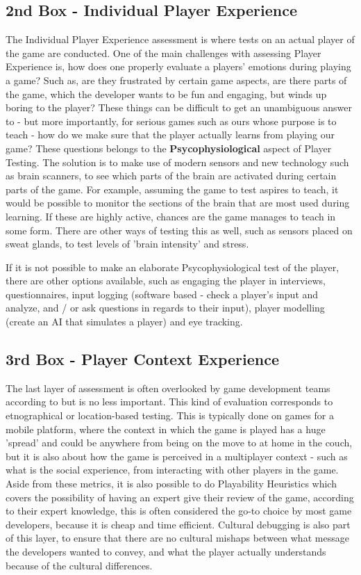 \subsection{2nd Box - Individual Player Experience}

The Individual Player Experience assessment is where tests on an actual player of the game are conducted. One of the main challenges with assessing 
Player Experience is, how does one properly evaluate a players' emotions during playing a game? Such as, are they frustrated by certain game aspects, 
are there parts of the game, which the developer wants to be fun and engaging, but winds up boring to the player? These things can be difficult to get 
an unambiguous answer to - but more importantly, for serious games such as ours whose purpose is to teach - how do we make sure that the player 
actually learns from playing our game? These questions belongs to the \textbf{Psycophysiological} aspect of Player Testing. The solution is to make use 
of modern sensors and new technology such as brain scanners, to see which parts of the brain are activated during certain parts of the game. For 
example, assuming the game to test aspires to teach, it would be possible to monitor the sections of the brain that are most used during learning. If 
these are highly active, chances are the game manages to teach in some form. There are other ways of testing this as well, such as sensors placed on 
sweat glands, to test levels of 'brain intensity' and stress.


If it is not possible to make an elaborate Psycophysiological test of the player, there are other options available, such as engaging the player in 
interviews, questionnaires, input logging (software based - check a player's input and analyze, and / or ask questions in regards to their input), 
player modelling (create an AI that simulates a player) and eye tracking.


\subsection{3rd Box - Player Context Experience}

The last layer of assessment is often overlooked by game development teams according to  but is no less important. This kind of 
evaluation corresponds to etnographical or location-based testing. This is typically done on games for a mobile platform, where the context in which 
the game is played has a huge 'spread' and could be anywhere from being on the move to at home in the couch, but it is also about how the game is 
perceived in a multiplayer context - such as what is the social experience, from interacting with other players in the game. Aside from these metrics, 
it is also possible to do Playability Heuristics which covers the possibility of having an expert give their review of the game, according to their 
expert knowledge, this is often considered the go-to choice by most game developers, because it is cheap and time efficient. Cultural debugging is also 
part of this layer, to ensure that there are no cultural mishaps between what message the developers wanted to convey, and what the player actually 
understands because of the cultural differences.

